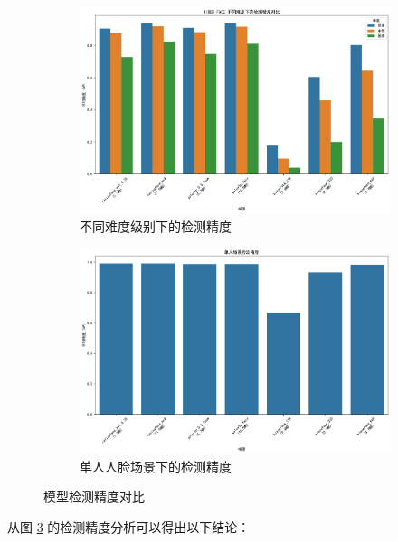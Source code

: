 \documentclass{article}
\begin{document}
\begin{figure}[htbp]
    \centering
    \begin{subfigure}[b]{0.48\textwidth}
        \includegraphics[width=\textwidth]{imgs/ap_comparison.png}
        \caption{不同难度级别下的检测精度}
        \label{fig:ap_comparison}
    \end{subfigure}
    \hfill
    \begin{subfigure}[b]{0.48\textwidth}
        \includegraphics[width=\textwidth]{imgs/one_face_ap.png}
        \caption{单人人脸场景下的检测精度}
        \label{fig:one_face_ap}
    \end{subfigure}
    \caption{模型检测精度对比}
    \label{fig:precision_analysis}
\end{figure}

从图 \ref{fig:precision_analysis} 的检测精度分析可以得出以下结论：
\end{document}
